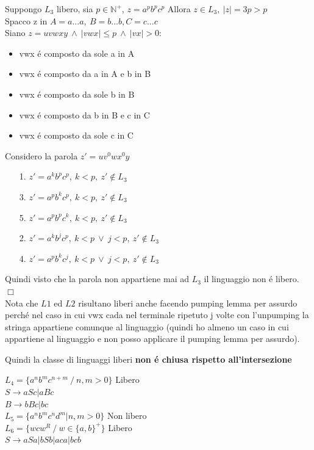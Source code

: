 Suppongo $L_3$ libero, sia $p \in \mathbb{N}^+$, $z = a^pb^pc^p$
Allora $z \in  L_3,\ |z|=3p>p$\\
Spacco z in $A=a...a,\ B = b...b, C=c...c$\\
Siano $z = uvwxy\ \land\ |vwx| \leq p \ \land\ |vx| > 0 $:
\begin{itemize}
    \item vwx \'e composto da sole a in A\\
    \item vwx \'e composto da a in A e b in B\\
    \item vwx \'e composto da sole b in B\\
    \item vwx \'e composto da b in B e c in C\\
    \item vwx \'e composto da sole c in C\\
\end{itemize} 
Considero la parola $z' = uv^0wx^0y$ 
\begin{itemize}
    \item[1.] $z' = a^kb^pc^p,\ k<p,\ z' \not\in L_3 $\\
    \item[3.] $z' = a^pb^kc^p,\ k<p,\ z' \not\in L_3 $\\
    \item[5.] $z' = a^pb^pc^k,\ k<p,\ z' \not\in L_3 $\\
    \item[2.] $z' = a^kb^jc^p,\ k<p\ \lor\ j < p ,\ z' \not\in L_3 $\\
    \item[4.] $z' = a^pb^kc^j,\ k<p\ \lor\ j < p ,\ z' \not\in L_3 $\\
\end{itemize}
Quindi visto che la parola non appartiene mai ad $L_3$ il linguaggio non \'e libero.
$\Box$\\[5pt]
Nota che $L1$ ed $L2$ risultano liberi anche facendo pumping lemma per assurdo perch\'e nel caso in cui vwx cada nel terminale ripetuto 
j volte con l'unpumping la stringa appartiene comunque al linguaggio (quindi ho almeno un caso in cui appartiene al linguaggio e non posso
applicare il pumping lemma per assurdo).

\begin{tcolorbox}\begin{center}
    Quindi la classe di linguaggi liberi \textbf{non \'e chiusa rispetto all'intersezione}
\end{center}\end{tcolorbox}

$L_4 = \{a^nb^mc^{n+m} \ / \ n,m>0\}$ Libero\\
$S \rightarrow aSc | aBc$\\
$B \rightarrow bBc|bc$\\

$L_5 = \{ a^nb^mc^nd^m | n,m > 0\}$ Non libero \\
$L_6= \{ wcw^R \ / \ w \in \{a,b\}^+\}$ Libero \\
$S \rightarrow aSa | bSb | aca|bcb$